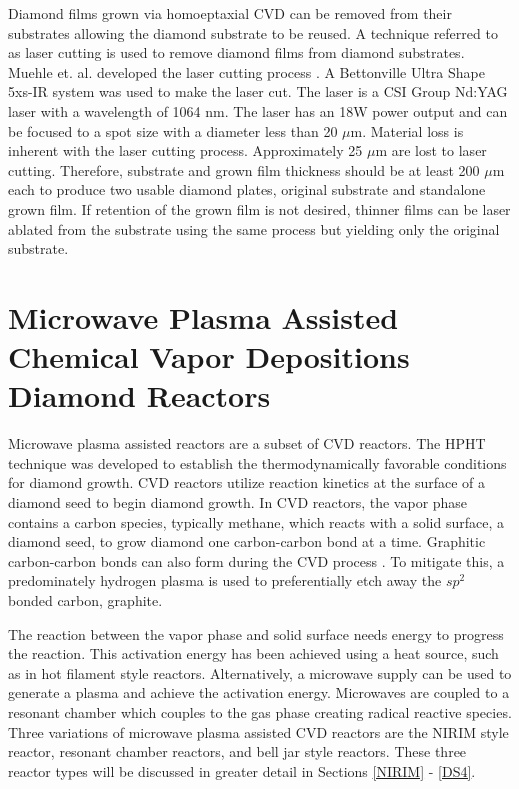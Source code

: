 Diamond films grown via homoeptaxial CVD can be removed from their substrates allowing the diamond substrate to be reused. A technique referred to as laser cutting is used to remove diamond films from diamond substrates. Muehle et. al. developed the laser cutting process \cite{Muehle2014SubstrateSynthesis}. A Bettonville Ultra Shape 5xs-IR system was used to make the laser cut. The laser is a CSI Group Nd:YAG laser with a wavelength of 1064 nm. The laser has an 18W power output and can be focused to a spot size with a diameter less than 20 $\mu$m. Material loss is inherent with the laser cutting process. Approximately 25 $\mu$m are lost to laser cutting. Therefore, substrate and grown film thickness should be at least 200 $\mu$m each to produce two usable diamond plates, original substrate and standalone grown film. If retention of the grown film is not desired, thinner films can be laser ablated from the substrate using the same process but yielding only the original substrate.

\section{Microwave Plasma Assisted Chemical Vapor Depositions Diamond Reactors}
\indent

Microwave plasma assisted reactors are a subset of CVD reactors. The HPHT technique was developed to establish the thermodynamically favorable conditions for diamond growth. CVD reactors utilize reaction kinetics at the surface of a diamond seed to begin diamond growth. In CVD reactors, the vapor phase contains a carbon species, typically methane, which reacts with a solid surface, a diamond seed, to grow diamond one carbon-carbon bond at a time. Graphitic carbon-carbon bonds can also form during the CVD process \cite{Liou1989Low-temperatureDeposition,Bachmann1991DIAMONDDEPOSITION}. To mitigate this, a predominately hydrogen plasma is used to preferentially etch away the $sp^2$ bonded carbon, graphite.

The reaction between the vapor phase and solid surface needs energy to progress the reaction. This activation energy has been achieved using a heat source, such as in hot filament style reactors. Alternatively, a microwave supply can be used to generate a plasma and achieve the activation energy. Microwaves are coupled to a resonant chamber which couples to the gas phase creating radical reactive species. Three variations of microwave plasma assisted CVD reactors are the NIRIM style reactor, resonant chamber reactors, and bell jar style reactors. These three reactor types will be discussed in greater detail in Sections \ref{NIRIM} - \ref{DS4}.


